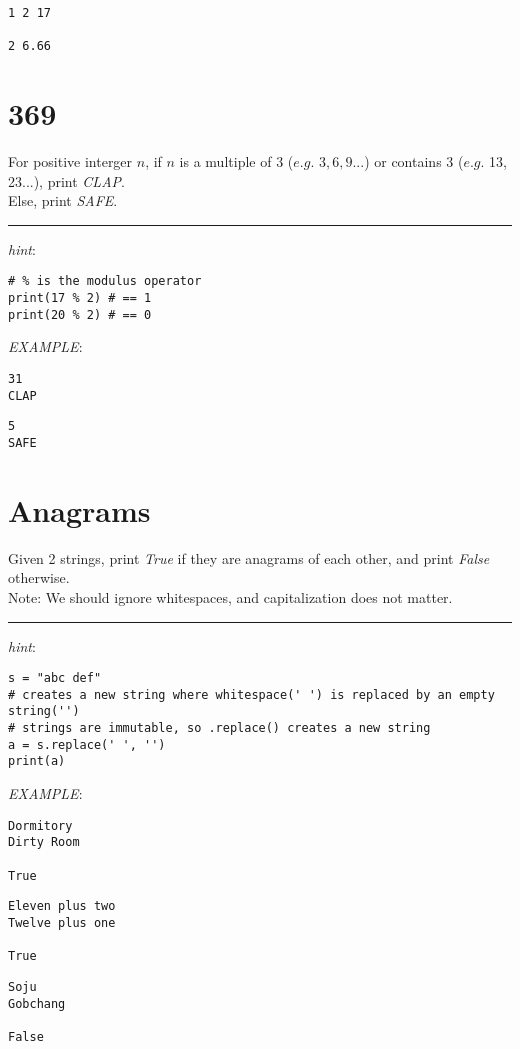 \documentclass{article}
\begin{document}
\begin{lstlisting}
1 2 17

2 6.66
\end{lstlisting}

\section{369}
For positive interger $n$, if $n$ is a multiple of $3$ ($e.g.$ $3,6,9...$) or
contains $3$ ($e.g.$ 13, 23...), print \textit{CLAP}.\\
Else, print \textit{SAFE}.\\
\noindent\rule{\textwidth}{0.9pt}
\textit{hint}:
\begin{lstlisting}
# % is the modulus operator
print(17 % 2) # == 1
print(20 % 2) # == 0
\end{lstlisting}
\textit{EXAMPLE}:\\
\begin{lstlisting}
31
CLAP
\end{lstlisting}
\begin{lstlisting}
5
SAFE
\end{lstlisting}

\section{Anagrams}
Given 2 strings, print \textit{True} if they are anagrams of each other, and
print \textit{False} otherwise.\\
Note: We should ignore whitespaces, and capitalization does not matter.\\
\noindent\rule{\textwidth}{0.9pt}
\textit{hint}:
\begin{lstlisting}
s = "abc def"
# creates a new string where whitespace(' ') is replaced by an empty string('')
# strings are immutable, so .replace() creates a new string
a = s.replace(' ', '')
print(a)
\end{lstlisting}
\textit{EXAMPLE}:\\
\begin{lstlisting}
Dormitory
Dirty Room

True
\end{lstlisting}
\begin{lstlisting}
Eleven plus two
Twelve plus one

True
\end{lstlisting}
\begin{lstlisting}
Soju
Gobchang

False
\end{lstlisting}
\end{document}
